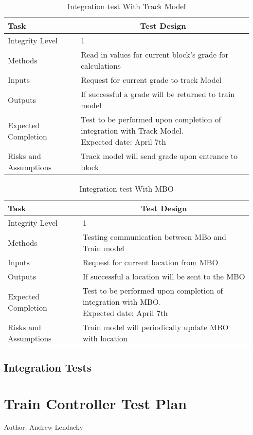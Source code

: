 \documentclass[]{article}
\begin{document}
	\begin{table}[H]
		\centering
		\caption{Integration test With Track Model}
		\begin{tabular}{|l|l|}
			\hline
			Task & \multicolumn{1}{c|}{Test Design} \\ \hline
			Integrity Level & 1 \\ \hline
			Methods & Read in values for current block's grade for calculations \\ \hline
			Inputs & Request for current grade to track Model\\ \hline
			Outputs & If successful a grade will be returned to train model \\ \hline
			Expected Completion & \parbox[t]{10cm}{Test to be performed upon completion of integration with Track Model.\\ Expected date: April 7th}\\ \hline
			Risks and Assumptions & Track model will send grade upon entrance to block\\ \hline
		\end{tabular}
	\end{table}

	\begin{table}[H]
		\centering
		\caption{Integration test With MBO}
		\begin{tabular}{|l|l|}
			\hline
			Task & \multicolumn{1}{c|}{Test Design} \\ \hline
			Integrity Level & 1 \\ \hline
			Methods & Testing communication between MBo and Train model \\ \hline
			Inputs & Request for current location from MBO\\ \hline
			Outputs & If successful a location will be sent to the MBO \\ \hline
			Expected Completion & \parbox[t]{10cm}{Test to be performed upon completion of integration with MBO.\\ Expected date: April 7th}\\ \hline
			Risks and Assumptions & Train model will periodically update MBO with location\\ \hline
		\end{tabular}
	\end{table}
\subsection{Integration Tests}

\section{Train Controller Test Plan}
Author: Andrew Lendacky
\end{document}
